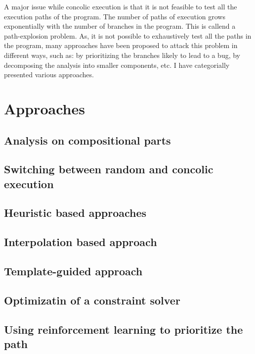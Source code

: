 \documentclass[	runningheads,
				a4paper]{llncs}
\begin{document}
A major issue while concolic execution is that it is not feasible to test all the execution paths of the program. The number of paths of execution grows exponentially with the number of branches in the program. This is callend a path-explosion problem. As, it is not possible to exhaustively test all the paths in the program, many approaches have been proposed to attack this problem in different ways, such as: by prioritizing the branches likely to lead to a bug, by decomposing the analysis into smaller components, etc. I have categorially presented various approaches.

\section{Approaches}

\subsection{Analysis on compositional parts}

\subsection{Switching between random and concolic execution}

\subsection{Heuristic based approaches}

\subsection{Interpolation based approach}

\subsection{Template-guided approach}

\subsection{Optimizatin of a constraint solver}

\subsection{Using reinforcement learning to prioritize the path}


\end{document}
